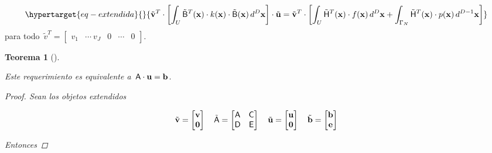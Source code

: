 \documentclass[
  12pt,
  a4paper,
  table]{scrbook}
\theoremstyle{plain}
\theoremstyle{definition}
\theoremstyle{plain}
\newtheorem{theorem}{Teorema}[chapter]
\theoremstyle{plain}
\theoremstyle{remark}
\begin{document}
\begin{equation}\protect\hypertarget{eq-extendida}{}{
\tilde{\vec{v}}^T \cdot \left[ \int_U \tilde{\mat{B}}^T(\vec{x}) \cdot k(\vec{x}) \cdot \tilde{\mat{B}}(\vec{x}) \, d^D\vec{x} \right] \cdot \tilde{\vec{u}}
=
\tilde{\vec{v}}^T \cdot \left[ \int_{U} \tilde{\mat{H}}^T(\vec{x}) \cdot f(\vec{x}) \, d^D \vec{x}
+ \int_{\Gamma_N} \tilde{\mat{H}}^T(\vec{x}) \cdot p(\vec{x}) \, d^{D-1}\vec{x} \right]
}\label{eq-extendida}\end{equation} para
todo~\(\tilde{v}^T = \begin{bmatrix} v_1 & \cdots \ v_J & 0 & \cdots & 0\end{bmatrix}\).

\begin{theorem}[]\protect\hypertarget{thm-extendida}{}\label{thm-extendida}

Este requerimiento es equivalente a~\(\mathsf{A} \cdot \mathbf{u} = \mathbf{b}\).

\begin{proof}

Sean los objetos extendidos

\[
\tilde{\mathbf{v}} =
\begin{bmatrix}
\mathbf{v} \\
\mathbf{0}
\end{bmatrix}
\quad
\tilde{\mathsf{A}} =
\begin{bmatrix}
\mathsf{A} & \mathsf{C} \\
\mathsf{D} & \mathsf{E} \\
\end{bmatrix}
\quad
\tilde{\mathbf{u}} =
\begin{bmatrix}
\mathbf{u} \\
\mathbf{0}
\end{bmatrix}
\quad
\tilde{\mathbf{b}} =
\begin{bmatrix}
\mathbf{b} \\
\mathbf{e}
\end{bmatrix}
\]

Entonces


\end{proof}
\end{theorem}
\end{document}
